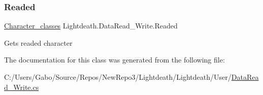 \subsubsection{\texorpdfstring{Readed}{Readed}}
{\footnotesize\ttfamily \hyperlink{class_lightdeath_1_1_character__classes}{Character\+\_\+classes} Lightdeath.\+Data\+Read\+\_\+\+Write.\+Readed\hspace{0.3cm}{\ttfamily [get]}}



Gets readed character 



The documentation for this class was generated from the following file\+:\begin{DoxyCompactItemize}
\item 
C\+:/\+Users/\+Gabo/\+Source/\+Repos/\+New\+Repo3/\+Lightdeath/\+Lightdeath/\+User/\hyperlink{_data_read___write_8cs}{Data\+Read\+\_\+\+Write.\+cs}\end{DoxyCompactItemize}
